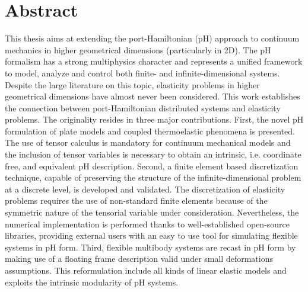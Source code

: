 \chapter*{Abstract}

This thesis aims at extending the port-Hamiltonian (pH) approach to continuum mechanics in higher geometrical dimensions (particularly in 2D). The pH formalism has a strong multiphysics character and represents a unified framework to model, analyze and control both finite- and infinite-dimensional systems. Despite the large literature on this topic, elasticity problems in higher geometrical dimensions have almost never been considered.  This work establishes the connection between port-Hamiltonian distributed systems and elasticity problems. The originality resides in three major contributions. First, the novel pH formulation of plate models and coupled thermoelastic phenomena is presented. The use of tensor calculus is mandatory for continuum mechanical models and the inclusion of tensor variables is necessary to obtain an intrinsic, i.e. coordinate free, and equivalent pH description. Second, a finite element based discretization technique, capable of preserving the structure of the infinite-dimensional problem at a discrete level, is developed and validated. The discretization of elasticity problems requires the use of non-standard finite elements because of the symmetric nature of the tensorial variable under consideration. Nevertheless, the numerical implementation is performed thanks to well-established open-source libraries, providing external users with an easy to use tool for simulating flexible systems in pH form. Third, flexible multibody systems are recast in pH form by making use of a floating frame description valid under small deformations assumptions. This reformulation include all kinds of linear elastic models and exploits the intrinsic modularity of pH systems.   \\\\